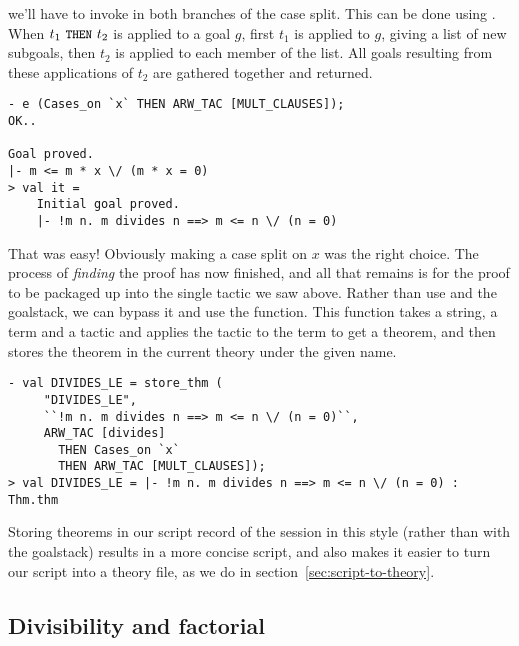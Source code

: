     we'll have to invoke  in both branches of the case
    split. This can be done using .  When $t_1 \
    \mbox{\ml{THEN}}\ t_2$ is applied to a goal $g$, first $t_1$ is
    applied to $g$, giving a list of new subgoals, then $t_2$ is
    applied to each member of the list. All goals resulting from these
    applications of $t_2$ are gathered together and returned.
\begin{session}\begin{verbatim}
- e (Cases_on `x` THEN ARW_TAC [MULT_CLAUSES]);
OK..

Goal proved.
|- m <= m * x \/ (m * x = 0)
> val it =
    Initial goal proved.
    |- !m n. m divides n ==> m <= n \/ (n = 0)
\end{verbatim}\end{session}
    That was easy! Obviously making a case split on $x$ was the right
    choice. The process of {\it finding\/} the proof has now finished,
    and all that remains is for the proof to be packaged up into the
    single tactic we saw above.  Rather than use \ml{top\_thm} and the
    goalstack, we can bypass it and use the \ml{store\_thm} function.
    This function takes a string, a term and a tactic and applies the
    tactic to the term to get a theorem, and then stores the theorem
    in the current theory under the given name.
\begin{session}\begin{verbatim}
- val DIVIDES_LE = store_thm (
     "DIVIDES_LE",
     ``!m n. m divides n ==> m <= n \/ (n = 0)``,
     ARW_TAC [divides]
       THEN Cases_on `x`
       THEN ARW_TAC [MULT_CLAUSES]);
> val DIVIDES_LE = |- !m n. m divides n ==> m <= n \/ (n = 0) : Thm.thm
\end{verbatim}\end{session}
    Storing theorems in our script record of the session in this style
    (rather than with the goalstack) results in a more concise script,
    and also makes it easier to turn our script into a theory file, as
    we do in section~\ref{sec:script-to-theory}.

\subsection{Divisibility and factorial}

